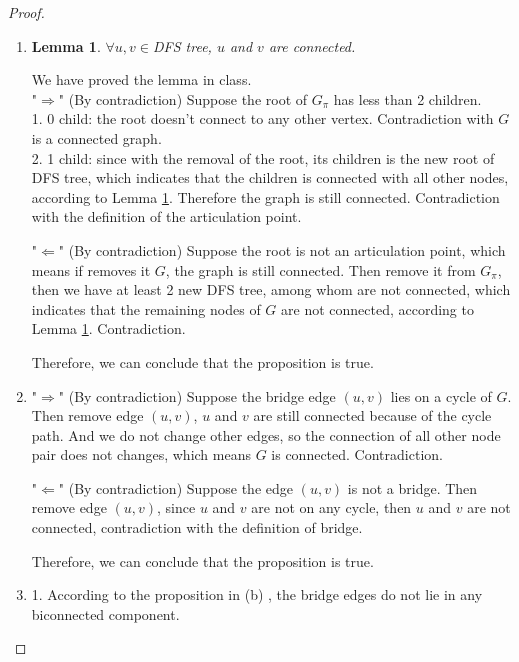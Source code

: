 \documentclass[12pt,a4paper]{article}
\newtheorem{lemma}[theorem]{Lemma}
\theoremstyle{definition}
\begin{document}
\begin{enumerate}
	\begin{proof}
		\begin{enumerate}
			\item 
			\begin{lemma}\label{lemma1}
				$\forall u,v\in $DFS tree, $ u $ and $ v $ are connected.
			\end{lemma}
			We have proved the lemma in class.\\
			"$ \Rightarrow $" (By contradiction) Suppose the root of $ G_{\pi} $ has less than 2 children.\\
			1. 0 child: the root doesn't connect to any other vertex. Contradiction with $ G $ is a  connected graph.\\
			2. 1 child: since with the removal of the root, its children is the new root of DFS tree, which indicates that the children is connected with all other nodes, according to Lemma \ref{lemma1}. Therefore the graph is still connected. Contradiction with the definition of the articulation point.
			
			"$ \Leftarrow $" (By contradiction) Suppose the root is not an articulation point, which means if removes it $ G $, the graph is still connected. Then remove it from  $G_{\pi} $, then we have at least 2 new DFS tree, among whom are not connected, which indicates that the remaining nodes of $ G $ are not connected, according to Lemma \ref{lemma1}. Contradiction.
			
			Therefore, we can conclude that the proposition is true.
			\item "$ \Rightarrow $" (By contradiction) Suppose the bridge edge $ (u,v) $ lies on a cycle of $ G $. Then remove edge $ (u,v) $, $ u $ and $ v $ are still connected because of the cycle path. And we do not change other edges, so the connection of all other node pair does not changes, which means $ G $ is connected. Contradiction.
			
			"$ \Leftarrow $" (By contradiction) Suppose the edge $ (u,v) $ is not a bridge. Then remove edge $ (u,v) $, since $ u $ and $ v $ are not on any cycle, then $ u $ and $ v $ are not connected, contradiction with the definition of bridge.
			
			Therefore, we can conclude that the proposition is true.
			\item 1. According to the proposition in (b) , the bridge edges do not lie in any biconnected component.
			

\end{enumerate}
\end{proof}
\end{enumerate}
\end{document}

